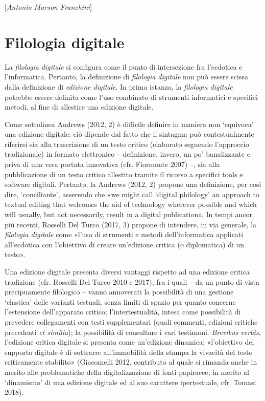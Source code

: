{{\hrulefill 

{[}\emph{Antonio Marson Franchini}{]}




\chapter{Filologia digitale}

La \emph{filologia} \emph{digitale} si configura come il punto di
intersezione fra l'ecdotica e l'informatica. Pertanto, la definizione di
\emph{filologia digitale} non può essere scissa dalla definizione di
\emph{edizione digitale}. In prima istanza, la \emph{filologia digitale}
potrebbe essere definita come l'uso combinato di strumenti informatici e
specifici metodi, al fine di allestire una edizione digitale.

Come sottolinea Andrews (2012, 2) è difficile definire in maniera non
`equivoca' una edizione digitale: ciò dipende dal fatto che il sintagma
può contestualmente riferirsi sia alla trascrizione di un testo critico
(elaborato seguendo l'approccio tradizionale) in formato elettronico --
definizione, invero, un po' banalizzante e priva di una vera portata
innovativa (cfr. Fiormonte 2007) --, sia alla pubblicazione di un testo
critico allestito tramite il ricorso a specifici tools e software
digitali. Pertanto, la Andrews (2012, 2) propone una definizione, per
così dire, `conciliante', asserendo che «we might call `digital
philology' an approach to textual editing that welcomes the aid of
technology wherever possible and which will usually, but not
necessarily, result in a digital publication». In tempi ancor più
recenti, Rosselli Del Turco (2017, 3) propone di intendere, in via
generale, la \emph{filologia digitale} come «l'uso di strumenti e metodi
dell'informatica applicati all'ecdotica con l'obiettivo di creare
un'edizione critica (o diplomatica) di un testo».

Una edizione digitale presenta diversi vantaggi rispetto ad una edizione
critica tradizione (cfr. Rosselli Del Turco 2010 e 2017), fra i quali --
da un punto di vista precipuamente filologico -- vanno annoverati la
possibilità di una gestione `elastica' delle varianti testuali, senza
limiti di spazio per quanto concerne l'estensione dell'apparato critico;
l'intertestualità, intesa come possibilità di prevedere collegamenti con
testi supplementari (quali commenti, edizioni critiche precedenti
\emph{et similia}); la possibilità di consultare i vari testimoni.
\emph{Brevibus verbis}, l'edizione critica digitale si presenta come
un'edizione dinamica: «l'obiettivo del supporto digitale è di sottrarre
all'immobilità della stampa la vivacità del testo criticamente
stabilito» (Giacomelli 2012, contributo al quale si rimanda anche in
merito alle problematiche della digitalizzazione di fonti papiracee; in
merito al `dinamismo' di una edizione digitale ed al suo carattere
ipertestuale, cfr. Tomasi 2018).

}}
